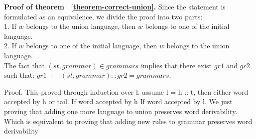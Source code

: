 \textbf{Proof of theorem ~\ref{theorem-correct-union}.} Since the statement is formulated as an equivalence, we divide the proof into two parts:\\
1. If $w$ belongs to the union language, then $w$ belongs to one of the initial language. \\
2. If $w$ belongs to one of the initial language, then $w$ belongs to the union language. \\
The fact that $(st,grammar) \in grammars$ implies that there exist $gr1$ and $gr2$ such that: $gr1 ++ (st, grammar) :: gr2 = grammars$. 

Proof.
This proved through induction over l.
assume l = h :: t, then either word accepted by h or tail.
If word accepted by h
If word accepted by l. We just proving that adding one more language to union preserves
word derivability. 
Which is equivalent to proving that adding new rules to grammar preserves
word derivability

